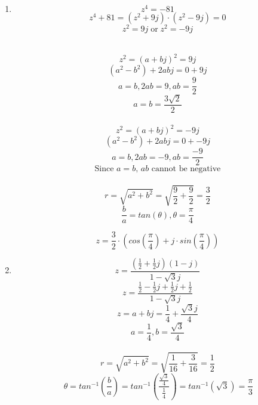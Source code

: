 \documentclass[10pt,a4paper, margin=1in]{article}
\begin{document}
\begin{enumerate}
\begin{enumerate}
\begin{enumerate}
        \end{enumerate}
            
    \item 
        \[ z^4 = -81 \]
        \[ z^4 + 81 = (z^2 + 9j) \cdot (z^2 - 9j) = 0 \]
        \[ z^2 = 9j \; \text{or} \; z^2 = -9j \]
        
        ~ \\
        \[ z^2 = (a + bj)^2 = 9j \]
        \[ (a^2 - b^2) + 2abj = 0 + 9j \]
        \[ a = b, 2ab = 9, ab = \frac{9}{2} \]
        \[ a = b = \frac{3\sqrt{2}}{2}  \]
        ~ \\
        \[ z^2 = (a + bj)^2 = -9j \]
        \[ (a^2 - b^2) + 2abj = 0 + -9j \]
        \[ a = b, 2ab = -9, ab = \frac{-9}{2} \]
        \[ \text{Since $a = b$, $ab$ cannot be negative} \]
        ~ \\
        \[ r = \sqrt{a^2 + b^2} = \sqrt{\frac{9}{2} + \frac{9}{2}} = \frac{3}{2} \]
        \[ \frac{b}{a} = tan(\theta), \theta = \frac{\pi}{4} \]
        
        \[ z = \frac{3}{2} \cdot (cos(\frac{\pi}{4}) + j \cdot sin(\frac{\pi}{4})) \]
        
    \item 
        \[ z = \frac{(\frac{1}{2} + \frac{1}{2}j)(1-j)}{1 - \sqrt{3}j} \]
        \[ z = \frac{\frac{1}{2} - \frac{1}{2}j + \frac{1}{2}j + \frac{1}{2}}{1 - \sqrt{3}j} \]
        \[ z = a + bj = \frac{1}{4} + \frac{\sqrt{3}j}{4} \]
        \[ a = \frac{1}{4}, b = \frac{\sqrt{3}}{4} \]
        ~ \\
        \[ r = \sqrt{a^2 + b^2} = \sqrt{\frac{1}{16} + \frac{3}{16}} = \frac{1}{2}\]
        \[\ \theta = tan^{-1}(\frac{b}{a}) = tan^{-1}(\frac{\frac{\sqrt{3}}{4}}{\frac{1}{4}}) = tan^{-1}(\sqrt{3}) = \frac{\pi}{3}\]
    

\end{enumerate}
\end{enumerate}
\end{document}
